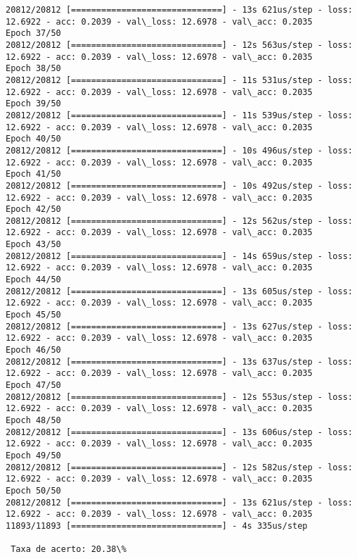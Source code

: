 \documentclass[11pt]{article}
\begin{document}
\begin{Verbatim}[commandchars=\\\{\}]
20812/20812 [==============================] - 13s 621us/step - loss: 12.6922 - acc: 0.2039 - val\_loss: 12.6978 - val\_acc: 0.2035
Epoch 37/50
20812/20812 [==============================] - 12s 563us/step - loss: 12.6922 - acc: 0.2039 - val\_loss: 12.6978 - val\_acc: 0.2035
Epoch 38/50
20812/20812 [==============================] - 11s 531us/step - loss: 12.6922 - acc: 0.2039 - val\_loss: 12.6978 - val\_acc: 0.2035
Epoch 39/50
20812/20812 [==============================] - 11s 539us/step - loss: 12.6922 - acc: 0.2039 - val\_loss: 12.6978 - val\_acc: 0.2035
Epoch 40/50
20812/20812 [==============================] - 10s 496us/step - loss: 12.6922 - acc: 0.2039 - val\_loss: 12.6978 - val\_acc: 0.2035
Epoch 41/50
20812/20812 [==============================] - 10s 492us/step - loss: 12.6922 - acc: 0.2039 - val\_loss: 12.6978 - val\_acc: 0.2035
Epoch 42/50
20812/20812 [==============================] - 12s 562us/step - loss: 12.6922 - acc: 0.2039 - val\_loss: 12.6978 - val\_acc: 0.2035
Epoch 43/50
20812/20812 [==============================] - 14s 659us/step - loss: 12.6922 - acc: 0.2039 - val\_loss: 12.6978 - val\_acc: 0.2035
Epoch 44/50
20812/20812 [==============================] - 13s 605us/step - loss: 12.6922 - acc: 0.2039 - val\_loss: 12.6978 - val\_acc: 0.2035
Epoch 45/50
20812/20812 [==============================] - 13s 627us/step - loss: 12.6922 - acc: 0.2039 - val\_loss: 12.6978 - val\_acc: 0.2035
Epoch 46/50
20812/20812 [==============================] - 13s 637us/step - loss: 12.6922 - acc: 0.2039 - val\_loss: 12.6978 - val\_acc: 0.2035
Epoch 47/50
20812/20812 [==============================] - 12s 553us/step - loss: 12.6922 - acc: 0.2039 - val\_loss: 12.6978 - val\_acc: 0.2035
Epoch 48/50
20812/20812 [==============================] - 13s 606us/step - loss: 12.6922 - acc: 0.2039 - val\_loss: 12.6978 - val\_acc: 0.2035
Epoch 49/50
20812/20812 [==============================] - 12s 582us/step - loss: 12.6922 - acc: 0.2039 - val\_loss: 12.6978 - val\_acc: 0.2035
Epoch 50/50
20812/20812 [==============================] - 13s 621us/step - loss: 12.6922 - acc: 0.2039 - val\_loss: 12.6978 - val\_acc: 0.2035
11893/11893 [==============================] - 4s 335us/step

 Taxa de acerto: 20.38\%

    \end{Verbatim}

    \begin{center}
    \end{center}
    { \hspace*{\fill} \\}
    
\end{document}
